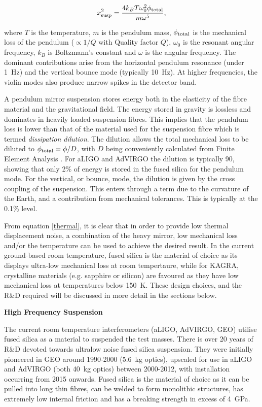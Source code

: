 \begin{center}
\begin{equation}\label{thermal}
x_{\rm susp}^{2}={\frac{4k_{B}T \omega_{0}^{2} \phi_{\rm total}}{m \omega^{5}}},
\end{equation}
\end{center}
where $T$ is the temperature, $m$ is the pendulum mass, $\phi_{\rm total}$ is the mechanical loss of the pendulum ($\propto 1/Q$ with Quality factor $Q$), $\omega_{0}$ is the resonant angular frequency, $k_{B}$ is Boltzmann's constant and $\omega$ is the angular frequency. The dominant contributions arise from the horizontal pendulum resonance (under 1~Hz) and the vertical bounce mode (typically 10~Hz). At higher frequencies, the violin modes also produce narrow spikes in the detector band.

A pendulum mirror suspension stores energy both in the elasticity of the fibre material and the gravitational field. The energy stored in gravity is lossless and dominates in heavily loaded suspension fibres. This implies that the pendulum loss is lower than that of the material used for the suspension fibre which is termed \emph{dissipation dilution}. The dilution allows the total mechanical loss to be diluted to $\phi_{\rm total}=\phi/D$, with $D$ being conveniently calculated from Finite Element Analysis \cite{Cumming:2009}. For aLIGO and AdVIRGO the dilution is typically 90, showing that only 2\% of energy is stored in the fused silica for the pendulum mode. For the vertical, or bounce, mode, the dilution is given by the cross coupling of the suspension. This enters through  a term due to the curvature of the Earth, and a contribution from mechanical tolerances. This is typically at the 0.1\% level.

From equation \ref{thermal}, it is clear that in order to provide low thermal displacement  noise, a combination of the heavy mirror, low mechanical loss and/or the temperature can be used to achieve the desired result. In the current ground-based room temperature, fused silica is the material of choice as its displays ultra-low mechanical loss at room tempertaure, while for KAGRA, crystalline materials (e.g. sapphire or silicon) are favoured  as they have low mechanical loss at temperatures below 150~K. These design choices, and the R\&D required will be discussed in more detail in the sections below.

{\bf High Frequency Suspension}

The current room temperature interferometers (aLIGO, AdVIRGO, GEO) utilise fused silica as a material to suspended the test masses. There is over 20 years of R\&D devoted towards ultralow noise fused silica suspension. They were initially pioneered in GEO around 1990-2000 (5.6~kg optics),  upscaled for use in aLIGO and AdVIRGO (both 40~kg optics) between 2000-2012, with installation occurring from 2015 onwards. Fused silica is the material of choice as it can be pulled into long thin fibres, can be welded to form monolithic structures, has extremely low internal friction and has a breaking strength in excess of 4~GPa. 


